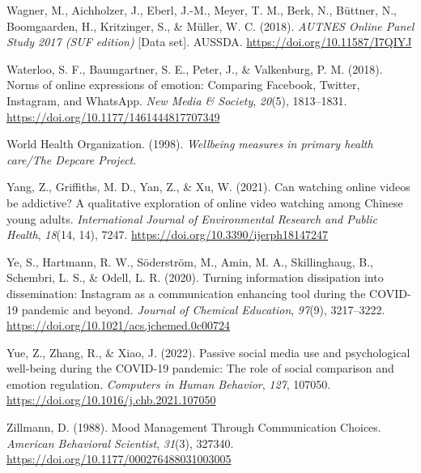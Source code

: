 \documentclass[
  man,mask]{apa7}
\newlength{\cslhangindent}
\newlength{\cslentryspacingunit} %
\newenvironment{CSLReferences}[2] %
 {%
  \setlength{\parindent}{0pt}
  \ifodd #1
  \let\oldpar\par
  \def\par{\hangindent=\cslhangindent\oldpar}
  \fi
  \setlength{\parskip}{#2\cslentryspacingunit}
 }%
 {}
\begin{document}
\begin{CSLReferences}{1}{0}
\leavevmode{}%
Wagner, M., Aichholzer, J., Eberl, J.-M., Meyer, T. M., Berk, N., Büttner, N., Boomgaarden, H., Kritzinger, S., \& Müller, W. C. (2018). \emph{{AUTNES Online Panel Study} 2017 ({SUF} edition)} {[}Data set{]}. {AUSSDA}. \url{https://doi.org/10.11587/I7QIYJ}

\leavevmode{}%
Waterloo, S. F., Baumgartner, S. E., Peter, J., \& Valkenburg, P. M. (2018). Norms of online expressions of emotion: {Comparing Facebook}, {Twitter}, {Instagram}, and {WhatsApp}. \emph{New Media \& Society}, \emph{20}(5), 1813--1831. \url{https://doi.org/10.1177/1461444817707349}

\leavevmode{}%
World Health Organization. (1998). \emph{Wellbeing measures in primary health care/{The Depcare Project}}.

\leavevmode{}%
Yang, Z., Griffiths, M. D., Yan, Z., \& Xu, W. (2021). Can watching online videos be addictive? {A} qualitative exploration of online video watching among {Chinese} young adults. \emph{International Journal of Environmental Research and Public Health}, \emph{18}(14, 14), 7247. \url{https://doi.org/10.3390/ijerph18147247}

\leavevmode{}%
Ye, S., Hartmann, R. W., Söderström, M., Amin, M. A., Skillinghaug, B., Schembri, L. S., \& Odell, L. R. (2020). Turning information dissipation into dissemination: {Instagram} as a communication enhancing tool during the {COVID-19} pandemic and beyond. \emph{Journal of Chemical Education}, \emph{97}(9), 3217--3222. \url{https://doi.org/10.1021/acs.jchemed.0c00724}

\leavevmode{}%
Yue, Z., Zhang, R., \& Xiao, J. (2022). Passive social media use and psychological well-being during the {COVID-19} pandemic: {The} role of social comparison and emotion regulation. \emph{Computers in Human Behavior}, \emph{127}, 107050. \url{https://doi.org/10.1016/j.chb.2021.107050}

\leavevmode{}%
Zillmann, D. (1988). Mood {Management Through Communication Choices}. \emph{American Behavioral Scientist}, \emph{31}(3), 327340. \url{https://doi.org/10.1177/000276488031003005}

\end{CSLReferences}
\end{document}
